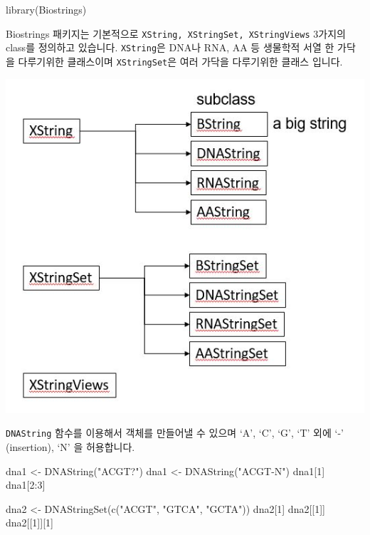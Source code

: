 \documentclass[
]{book}
\newenvironment{Shaded}{\begin{snugshade}}{\end{snugshade}}
\newcommand{\DecValTok}[1]{\textcolor[rgb]{0.00,0.00,0.81}{#1}}
\newcommand{\FunctionTok}[1]{\textcolor[rgb]{0.00,0.00,0.00}{#1}}
\newcommand{\NormalTok}[1]{#1}
\newcommand{\OtherTok}[1]{\textcolor[rgb]{0.56,0.35,0.01}{#1}}
\newcommand{\SpecialCharTok}[1]{\textcolor[rgb]{0.00,0.00,0.00}{#1}}
\newcommand{\StringTok}[1]{\textcolor[rgb]{0.31,0.60,0.02}{#1}}
\begin{document}
\begin{Shaded}
\begin{Highlighting}[]
\FunctionTok{library}\NormalTok{(Biostrings)}
\end{Highlighting}
\end{Shaded}

Biostrings 패키지는 기본적으로 \texttt{XString,\ XStringSet,\ XStringViews} 3가지의 class를 정의하고 있습니다. \texttt{XString}은 DNA나 RNA, AA 등 생물학적 서열 한 가닥을 다루기위한 클래스이며 \texttt{XStringSet}은 여러 가닥을 다루기위한 클래스 입니다.

\includegraphics{images/04/biostrings.JPG}

\texttt{DNAString} 함수를 이용해서 객체를 만들어낼 수 있으며 `A', `C', `G', `T' 외에 `-' (insertion), `N' 을 허용합니다.

\begin{Shaded}
\begin{Highlighting}[]
\NormalTok{dna1 }\OtherTok{\textless{}{-}} \FunctionTok{DNAString}\NormalTok{(}\StringTok{"ACGT?"}\NormalTok{)}
\NormalTok{dna1 }\OtherTok{\textless{}{-}} \FunctionTok{DNAString}\NormalTok{(}\StringTok{"ACGT{-}N"}\NormalTok{)}
\NormalTok{dna1[}\DecValTok{1}\NormalTok{]}
\NormalTok{dna1[}\DecValTok{2}\SpecialCharTok{:}\DecValTok{3}\NormalTok{]}

\NormalTok{dna2 }\OtherTok{\textless{}{-}} \FunctionTok{DNAStringSet}\NormalTok{(}\FunctionTok{c}\NormalTok{(}\StringTok{"ACGT"}\NormalTok{, }\StringTok{"GTCA"}\NormalTok{, }\StringTok{"GCTA"}\NormalTok{))}
\NormalTok{dna2[}\DecValTok{1}\NormalTok{]}
\NormalTok{dna2[[}\DecValTok{1}\NormalTok{]]}
\NormalTok{dna2[[}\DecValTok{1}\NormalTok{]][}\DecValTok{1}\NormalTok{]}
\end{Highlighting}
\end{Shaded}
\end{document}
